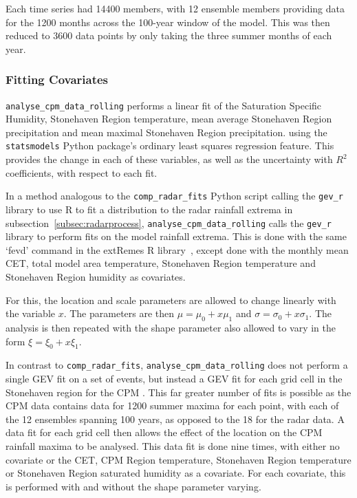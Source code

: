 Each time series had 14400 members,
    with 12 ensemble members providing data for the 1200 months across the 100-year window of the model.
This was then reduced to 3600 data points by only taking the three summer months of each year.

\subsubsection{Fitting Covariates}

\texttt{analyse\_cpm\_data\_rolling} performs a linear fit of the Saturation Specific Humidity,
    Stonehaven Region temperature, mean average Stonehaven Region precipitation and mean maximal Stonehaven Region precipitation.
    using the \texttt{statsmodels} Python package's ordinary least squares regression feature.
This provides the change in each of these variables, as well as the uncertainty with $R^2$ coefficients,
    with respect to each fit.

In a method analogous to the \texttt{comp\_radar\_fits} Python script calling the \texttt{gev\_r} library to use R to fit
    a distribution to the radar rainfall extrema in subsection~\ref{subsec:radarprocess},
    \texttt{analyse\_cpm\_data\_rolling} calls the \texttt{gev\_r} library to perform fits on the model rainfall extrema.
This is done with the same `fevd' command in the extRemes R library~\cite{extremes_R},
    except done with the monthly mean CET, total model area temperature, Stonehaven Region temperature and Stonehaven Region humidity as covariates.

For this,
    the location and scale parameters are allowed to change linearly with the variable $x$.
The parameters are then $\mu = \mu_0 + x\mu_1$ and $\sigma = \sigma_0 + x\sigma_1$.
The analysis is then repeated with the shape parameter also allowed to vary in the form $\xi = \xi_0 + x\xi_1$.

In contrast to \texttt{comp\_radar\_fits},
    \texttt{analyse\_cpm\_data\_rolling} does not perform a single GEV fit on a set of events,
    but instead a GEV fit for each grid cell in the Stonehaven region for the CPM .
This far greater number of fits is possible as the CPM data contains data for 1200 summer maxima for each point,
    with each of the 12 ensembles spanning 100 years,
    as opposed to the 18 for the radar data.
A data fit for each grid cell then allows the effect of the location on the CPM rainfall maxima to be analysed.
This data fit is done nine times,
    with either no covariate or the CET, CPM Region temperature, Stonehaven Region temperature or Stonehaven Region saturated humidity as a covariate.
For each covariate, this is performed with and without the shape parameter varying.

